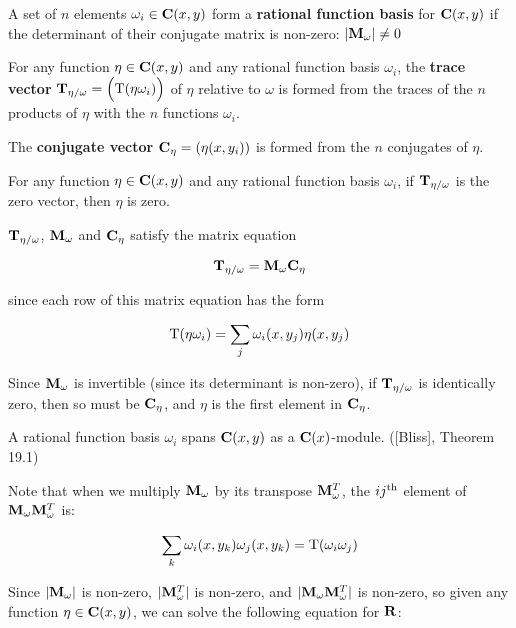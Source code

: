 A set of $n$ elements $\omega_i \in {\bf C}(x,y)$ form a {\bf rational
function basis} for ${\bf C}(x,y)$ if the determinant of their
conjugate matrix is non-zero: $|{\bf M}_\omega| \ne 0$

\enddefinition


For any function $\eta \in {\bf C}(x,y)$ and any rational function
basis $\omega_i$, the {\bf trace vector}
${\bf T}_{\eta/\omega} = \Big({\rm T}(\eta \omega_i)\Big)$ 
of $\eta$ relative to $\omega$
is formed from the
traces of the $n$ products of $\eta$ with the $n$ functions
$\omega_i$.

The {\bf conjugate vector} ${\bf C}_\eta = (\eta(x,y_i))$ is formed from the
$n$ conjugates of $\eta$.

\enddefinition

\theorem
\label{function is zero if trace vector is zero}

For any function $\eta \in {\bf C}(x,y)$ and any rational function
basis $\omega_i$, if ${\bf T}_{\eta/\omega}$ is the zero vector,
then $\eta$ is zero.

\proof

${\bf T}_{\eta/\omega}$, ${\bf M}_\omega$ and ${\bf C}_\eta$
satisfy the matrix equation

$${\bf T}_{\eta/\omega} = {\bf M}_\omega {\bf C}_\eta$$

since each row of this matrix equation has the form

$$ {\rm T}(\eta \omega_i) = \sum_j \omega_i(x,y_j)\eta(x,y_j) $$

Since ${\bf M}_\omega$ is invertible (since its determinant is
non-zero), if ${\bf T}_{\eta/\omega}$ is identically zero, then so must be
${\bf C}_\eta$, and $\eta$ is the first element in ${\bf C}_\eta$.

\endtheorem

\theorem
\label{|M| != 0 implies C(x) basis}

A rational function basis $\omega_i$ spans ${\bf C}(x,y)$ as
a ${\bf C}(x)$-module. ([Bliss], Theorem 19.1)

\proof

Note that when we multiply ${\bf M}_\omega$ by its transpose ${\bf
M}_\omega^T$, the $ij^{\rm th}$ element of ${\bf M}_\omega{\bf
M}_\omega^T$ is:

$$ \sum_k \omega_i(x, y_k)\omega_j(x, y_k) = {\rm T}(\omega_i \omega_j)$$

Since $|{\bf M}_\omega|$ is non-zero, $|{\bf M}_\omega^T|$ is
non-zero, and $|{\bf M}_\omega{\bf M}_\omega^T|$ is non-zero, so given
any function $\eta \in {\bf C}(x,y)$, we can solve the following
equation for ${\bf R}$:

